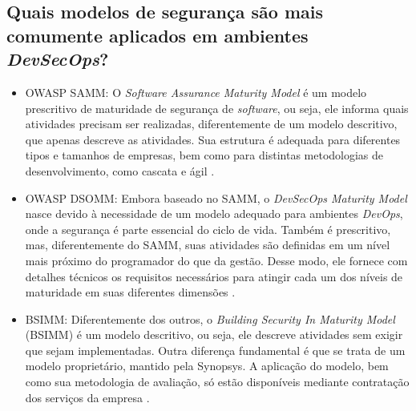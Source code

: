 \subsection{Quais modelos de segurança são mais comumente aplicados em ambientes \textit{DevSecOps}?}
\begin{itemize}
    \item OWASP SAMM: O \textit{Software Assurance Maturity Model} é um modelo prescritivo de maturidade de segurança de \textit{software}, ou seja, ele informa quais atividades precisam ser realizadas, diferentemente de um modelo descritivo, que apenas descreve as atividades. Sua estrutura é adequada para diferentes tipos e tamanhos de empresas, bem como para distintas metodologias de desenvolvimento, como cascata e ágil \cite{Lange2024}.
    \item OWASP DSOMM: Embora baseado no SAMM, o \textit{DevSecOps Maturity Model} nasce devido à necessidade de um modelo adequado para ambientes \textit{DevOps}, onde a segurança é parte essencial do ciclo de vida. Também é prescritivo, mas, diferentemente do SAMM, suas atividades são definidas em um nível mais próximo do programador do que da gestão. Desse modo, ele fornece com detalhes técnicos os requisitos necessários para atingir cada um dos níveis de maturidade em suas diferentes dimensões \cite{Lange2024}.
    \item BSIMM: Diferentemente dos outros, o \textit{Building Security In Maturity Model} (BSIMM) é um modelo descritivo, ou seja, ele descreve atividades sem exigir que sejam implementadas. Outra diferença fundamental é que se trata de um modelo proprietário, mantido pela Synopsys. A aplicação do modelo, bem como sua metodologia de avaliação, só estão disponíveis mediante contratação dos serviços da empresa \cite{Lange2024}.
\end{itemize}


